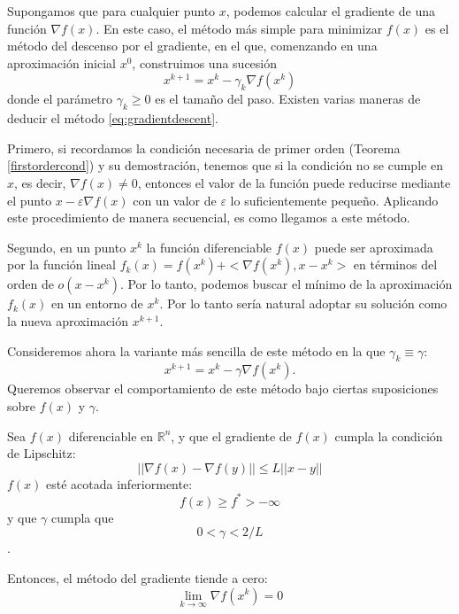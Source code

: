 Supongamos que para cualquier punto $x$, podemos calcular el gradiente de una función $\nabla f(x)$. En este caso, el método más simple para minimizar $f(x)$ es el método del descenso por el gradiente, en el que, comenzando en una aproximación inicial $x^0$, construimos una sucesión
\begin{equation}\label{eq:gradientdescent}
    x^{k+1}=x^k - \gamma_k \nabla f(x^k)
\end{equation}
donde el parámetro $\gamma_k \ge 0$ es el tamaño del paso. Existen varias maneras de deducir el método \ref{eq:gradientdescent}.

Primero, si recordamos la condición necesaria de primer orden (Teorema \ref{firstordercond}) y su demostración, tenemos que si la condición no se cumple en $x$, es decir, $\nabla f(x) \ne 0$, entonces el valor de la función puede reducirse mediante el punto $x - \varepsilon \nabla f(x)$ con un valor de $\varepsilon$ lo suficientemente pequeño. Aplicando este procedimiento de manera secuencial, es como llegamos a este método.

Segundo, en un punto $x^k$ la función diferenciable $f(x)$ puede ser aproximada por la función lineal $f_k(x)=f(x^k) + <\nabla f(x^k), x - x^k>$ en términos del orden de $o(x-x^k)$. Por lo tanto, podemos buscar el mínimo de la aproximación $f_k(x)$ en un entorno de $x^k$. Por lo tanto sería natural adoptar su solución como la nueva aproximación $x^{k+1}$. 

Consideremos ahora la variante más sencilla de este método en la que $\gamma_k \equiv \gamma$:
\begin{equation}
    x^{k+1}=x^k - \gamma \nabla f(x^k).
\end{equation}
Queremos observar el comportamiento de este método bajo ciertas suposiciones sobre $f(x)$ y $\gamma$.

\begin{theorem}
    Sea $f(x)$ diferenciable en $\mathbb{R}^n$, y que el gradiente de $f(x)$ cumpla la condición de Lipschitz:
    $$ || \nabla f(x) - \nabla f(y) || \le L ||x - y||$$
    $f(x)$ esté acotada inferiormente:
    $$ f(x) \ge f^* > - \infty $$
    y que $\gamma$ cumpla que
    $$0 < \gamma < 2/L $$.

    Entonces, el método del gradiente tiende a cero:
    $$ \lim_{k \to \infty}\nabla f(x^k) = 0 $$
\end{theorem}

